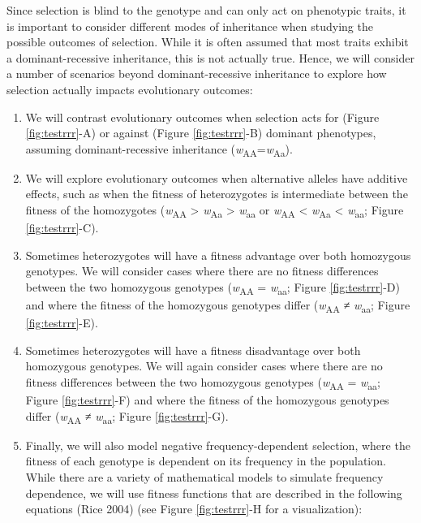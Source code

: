 \documentclass[
]{book}
\begin{document}
Since selection is blind to the genotype and can only act on phenotypic traits, it is important to consider different modes of inheritance when studying the possible outcomes of selection. While it is often assumed that most traits exhibit a dominant-recessive inheritance, this is not actually true. Hence, we will consider a number of scenarios beyond dominant-recessive inheritance to explore how selection actually impacts evolutionary outcomes:

\begin{enumerate}
\def\labelenumi{\arabic{enumi}.}
\item
  We will contrast evolutionary outcomes when selection acts for (Figure \ref{fig:testrrr}-A) or against (Figure \ref{fig:testrrr}-B) dominant phenotypes, assuming dominant-recessive inheritance (\emph{w}\textsubscript{AA}=\emph{w}\textsubscript{Aa}).
\item
  We will explore evolutionary outcomes when alternative alleles have additive effects, such as when the fitness of heterozygotes is intermediate between the fitness of the homozygotes (\emph{w}\textsubscript{AA} \textgreater{} \emph{w}\textsubscript{Aa} \textgreater{} \emph{w}\textsubscript{aa} or \emph{w}\textsubscript{AA} \textless{} \emph{w}\textsubscript{Aa} \textless{} \emph{w}\textsubscript{aa}; Figure \ref{fig:testrrr}-C).
\item
  Sometimes heterozygotes will have a fitness advantage over both homozygous genotypes. We will consider cases where there are no fitness differences between the two homozygous genotypes (\emph{w}\textsubscript{AA} = \emph{w}\textsubscript{aa}; Figure \ref{fig:testrrr}-D) and where the fitness of the homozygous genotypes differ (\emph{w}\textsubscript{AA} ≠ \emph{w}\textsubscript{aa}; Figure \ref{fig:testrrr}-E).
\item
  Sometimes heterozygotes will have a fitness disadvantage over both homozygous genotypes. We will again consider cases where there are no fitness differences between the two homozygous genotypes (\emph{w}\textsubscript{AA} = \emph{w}\textsubscript{aa}; Figure \ref{fig:testrrr}-F) and where the fitness of the homozygous genotypes differ (\emph{w}\textsubscript{AA} ≠ \emph{w}\textsubscript{aa}; Figure \ref{fig:testrrr}-G).
\item
  Finally, we will also model negative frequency-dependent selection, where the fitness of each genotype is dependent on its frequency in the population. While there are a variety of mathematical models to simulate frequency dependence, we will use fitness functions that are described in the following equations (Rice 2004) (see Figure \ref{fig:testrrr}-H for a visualization):
\end{enumerate}
\end{document}
